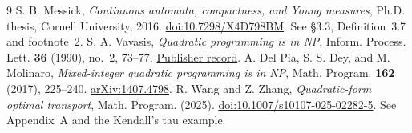 \documentclass[11pt,a4paper]{amsart}
\begin{document}
\begin{thebibliography}{9}
S. B. Messick, \emph{Continuous automata, compactness, and Young measures}, Ph.D. thesis, Cornell University, 2016. \href{https://doi.org/10.7298/X4D798BM}{doi:10.7298/X4D798BM}. See \S3.3, Definition~3.7 and footnote~2.
S. A. Vavasis, \emph{Quadratic programming is in NP}, Inform. Process. Lett. \textbf{36} (1990), no.~2, 73--77. \href{https://doi.org/10.1016/0020-0190(90)90100-C}{Publisher record}.
A. Del Pia, S. S. Dey, and M. Molinaro, \emph{Mixed-integer quadratic programming is in NP}, Math. Program. \textbf{162} (2017), 225--240. \href{https://arxiv.org/abs/1407.4798}{arXiv:1407.4798}.
R. Wang and Z. Zhang, \emph{Quadratic-form optimal transport}, Math. Program. (2025). \href{https://doi.org/10.1007/s10107-025-02282-5}{doi:10.1007/s10107-025-02282-5}. See Appendix~A and the Kendall's tau example.
\end{thebibliography}
\end{document}
